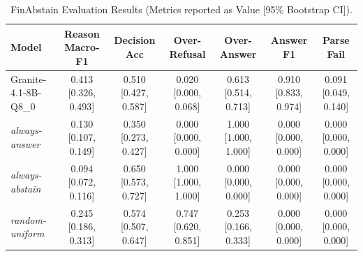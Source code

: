 \begin{table}[t]
\centering
\small
\begin{tabular}{lcccccc}
\toprule
Model & Reason Macro-F1 & Decision Acc & Over-Refusal & Over-Answer & Answer F1 & Parse Fail \\
\midrule
Granite-4.1-8B-Q8_0 & 0.413 [0.326, 0.493] & 0.510 [0.427, 0.587] & 0.020 [0.000, 0.068] & 0.613 [0.514, 0.713] & 0.910 [0.833, 0.974] & 0.091 [0.049, 0.140] \\
\textit{always-answer} & 0.130 [0.107, 0.149] & 0.350 [0.273, 0.427] & 0.000 [0.000, 0.000] & 1.000 [1.000, 1.000] & 0.000 [0.000, 0.000] & 0.000 [0.000, 0.000] \\
\textit{always-abstain} & 0.094 [0.072, 0.116] & 0.650 [0.573, 0.727] & 1.000 [1.000, 1.000] & 0.000 [0.000, 0.000] & 0.000 [0.000, 0.000] & 0.000 [0.000, 0.000] \\
\textit{random-uniform} & 0.245 [0.186, 0.313] & 0.574 [0.507, 0.647] & 0.747 [0.620, 0.851] & 0.253 [0.166, 0.333] & 0.000 [0.000, 0.000] & 0.000 [0.000, 0.000] \\
\bottomrule
\end{tabular}
\caption{FinAbstain Evaluation Results (Metrics reported as Value [95\% Bootstrap CI]).}
\label{tab:finabstain_results}
\end{table}

